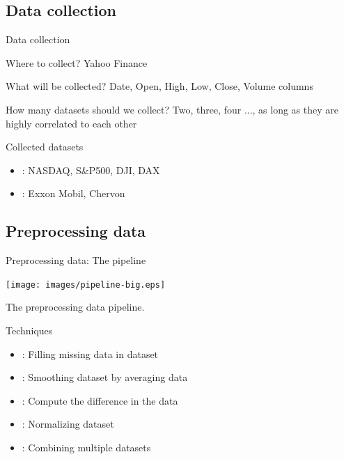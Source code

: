 \documentclass[compress, mathserif, fleqn, 10pt]{beamer}
\begin{document}
	\subsection{Data collection}
	\begin{frame}{Data collection}
		\begin{exampleblock}{Where to collect?}
			Yahoo Finance
		\end{exampleblock}
		\begin{exampleblock}{What will be collected?}
			Date, Open, High, Low, Close, Volume columns
		\end{exampleblock}
		\begin{exampleblock}{How many datasets should we collect?}
			Two, three, four ..., as long as they are highly correlated to each other
		\end{exampleblock}
		\begin{block}{Collected datasets}
			\begin{itemize}
				\item {}: NASDAQ, S\&P500, DJI, DAX
				
				\item {}: Exxon Mobil, Chervon
			\end{itemize}
		\end{block}
	\end{frame}
	
	\subsection{Preprocessing data}
	\begin{frame}{Preprocessing data: The pipeline}
		\centerline{\texttt{[image: images/pipeline-big.eps]}}
		\centerline{The preprocessing data pipeline.}
		\begin{block}{Techniques}
			\begin{itemize}
				\item {}: Filling missing data in dataset
				
				\item {}: Smoothing dataset by averaging data
				
				\item {}: Compute the difference in the data
				
				\item {}: Normalizing dataset
				
				\item {}: Combining multiple datasets
			\end{itemize}
		\end{block}
	\end{frame}
	
\end{document}

